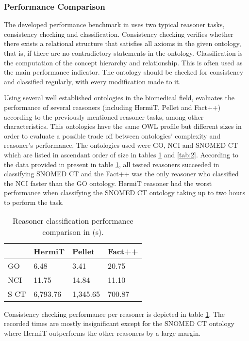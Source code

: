 \subsubsection{Performance Comparison}

The developed performance benchmark in \cite{Dentler2011} uses two typical reasoner tasks, consistency checking and classification. Consistency checking verifies whether there exists a relational structure that satisfies all axioms in the given ontology, that is, if there are no contradictory statements in the ontology. Classification is the computation of the concept hierarchy and relationship. This is often used as the main performance indicator. The ontology should be checked for consistency and classified regularly, with every modification made to it. 

Using several well established ontologies in the biomedical field, \cite{Dentler2011} evaluates the performance of several reasoners (including HermiT, Pellet and Fact++) according to the previously mentioned reasoner tasks, among other characteristics. This ontologies have the same OWL profile but different sizes in order to evaluate a possible trade off between ontologies' complexity and reasoner's performance. The ontologies used were GO, NCI and SNOMED CT which are listed in ascendant order of size in tables \ref{tab:1} and \ref{tab:2}. According to the data provided in \cite{Dentler2011} present in table \ref{tab:1}, all tested reasoners succeeded in classifying SNOMED CT and the Fact++ was the only reasoner who classified the NCI faster than the GO ontology. HermiT reasoner had the worst performance when classifying the SNOMED CT ontology taking up to two hours to perform the task.

\begin{table}[]
\centering
\begin{tabular}{|l|l|l|l|}
\hline
      &  HermiT    &  Pellet     &  Fact++    \\ \hline
GO    &    6.48    &  3.41       &  20.75     \\ \hline
NCI   &   11.75    &  14.84      &  11.10     \\ \hline
S CT  &  6,793.76  &  1,345.65   &  700.87    \\ \hline
\end{tabular}
\caption{Reasoner classification performance comparison in \cite{Dentler2011} (s).}
\label{tab:1}
\end{table}

Consistency checking performance per reasoner is depicted in table \ref{tab:1}. The recorded times are mostly insignificant except for the SNOMED CT ontology where HermiT outperforms the other reasoners by a large margin.

